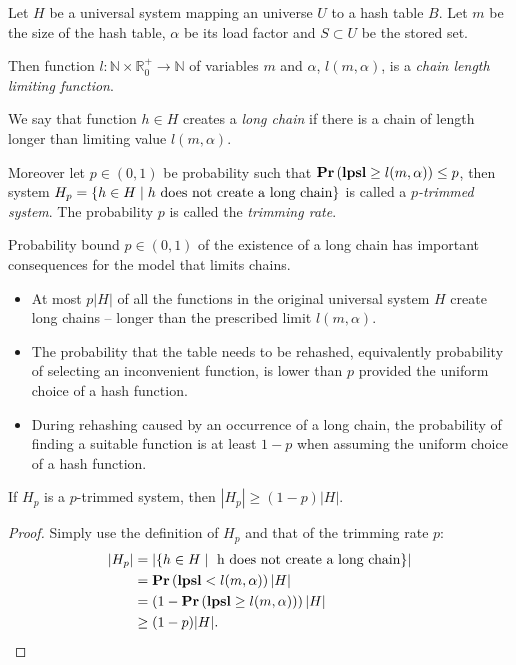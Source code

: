 \begin{definition}
Let $H$ be a universal system mapping an universe $U$ to a hash table $B$. Let $m$ be the size of the hash table, $\alpha$ be its load factor and $S \subset U$ be the stored set. 

Then function $l: \mathbb{N} \times \mathbb{R}_{0}^{+} \rightarrow \mathbb{N}$ of variables $m$ and $\alpha$, $l(m, \alpha)$, is a \emph{chain length limiting function}. 

We say that function $h \in H$ creates a \emph{long chain} if there is a chain of length longer than limiting value $l(m, \alpha)$.

Moreover let $p \in (0, 1)$ be probability such that $\mathbf{Pr}\left(\mathbf{lpsl} \geq l(m, \alpha)\right) \leq p$, then system $H_p = \{ h \in H \mid h \text{ does not create a long chain} \}$ is called a \emph{$p$-trimmed system}. The probability $p$ is called the \emph{trimming rate}.
\end{definition}

Probability bound $p \in (0, 1)$ of the existence of a long chain has important consequences for the model that limits chains.
\begin{itemize}
\item At most $p|H|$ of all the functions in the original universal system $H$ create long chains -- longer than the prescribed limit $l(m, \alpha)$. 
\item The probability that the table needs to be rehashed, equivalently probability of selecting an inconvenient function, is lower than $p$ provided the uniform choice of a hash function.
\item During rehashing caused by an occurrence of a long chain, the probability of finding a suitable function is at least $1 - p$ when assuming the uniform choice of a hash function.
\end{itemize}

\begin{lemma}
\label{lemma-size-of-trimmed-system}
If $H_p$ is a $p$-trimmed system, then $|H_p| \geq (1 - p)|H|$.
\end{lemma}
\begin{proof}
Simply use the definition of $H_p$ and that of the trimming rate $p$:
\[
\begin{split}
|H_p|
	& = |\lbrace h \in H \mid \text{ h does not create a long chain} \rbrace| \\
	& =\mathbf{Pr}\left(\mathbf{lpsl} < l(m, \alpha)\right) |H| \\
	& = \left(1 - \mathbf{Pr}\left(\mathbf{lpsl} \geq l(m, \alpha)\right)\right) |H| \\
	& \geq (1 - p)|H| \text{.}
\end{split}
\]
\end{proof}

